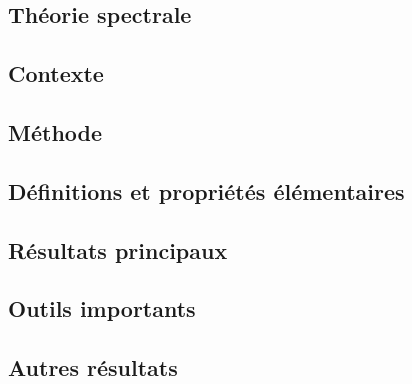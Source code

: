 \documentclass[11pt,a4paper]{article}
\begin{document}
\newpage
\begin{center}  
\section*{Théorie spectrale} 
\end{center}


\subsection*{Contexte}

\subsection*{Méthode}

\subsection*{Définitions et propriétés élémentaires}



\subsection*{Résultats principaux}


\subsection*{Outils importants}


\subsection*{Autres résultats}
\end{document}
